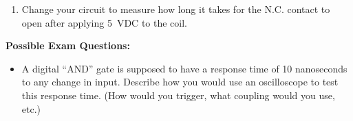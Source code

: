 \begin{enumerate}[wide]
\item Change your circuit to measure how long it takes for the N.C. contact to open after applying 5~VDC to the coil.

\end{enumerate}

\textbf{Possible Exam Questions:}

\begin{itemize}

\item A digital ``AND'' gate is supposed to have a response time of 10 nanoseconds to any change in input.  Describe how you would use an oscilloscope to test this response time.  (How would you trigger, what coupling would you use, etc.) 

\end{itemize}








